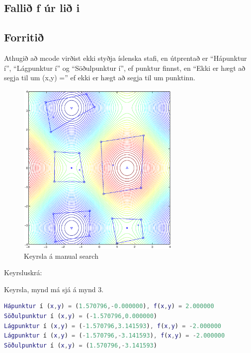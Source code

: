 \documentclass[a4]{article}
\begin{document}
\subsection*{Fallið f úr lið i}

\subsection*{Forritið}

Athugið að mcode virðist ekki styðja íslenska stafi, en útprentað er
``Hápunktur í'', ``Lágpunktur í'' og ``Söðulpunktur í'', ef punktur finnst,
en ``Ekki er hægt að segja til um (x,y) ='' ef ekki er hægt að segja til um punktinn.\\



\begin{figure}[h!]
\centering
\includegraphics[width=0.7\textwidth]{manualdaemi1.eps}
\caption{Keyrsla á manual search}
\end{figure}

\newpage
Keyrsluskrá:

Keyrsla, mynd má sjá á mynd 3.
\begin{lstlisting}[language=Matlab]
Hápunktur í (x,y) = (1.570796,-0.000000), f(x,y) = 2.000000
Söðulpunktur í (x,y) = (-1.570796,0.000000)
Lágpunktur í (x,y) = (-1.570796,3.141593), f(x,y) = -2.000000
Lágpunktur í (x,y) = (-1.570796,-3.141593), f(x,y) = -2.000000
Söðulpunktur í (x,y) = (1.570796,-3.141593)
\end{lstlisting}
\end{document}
